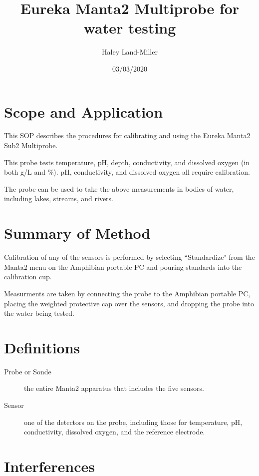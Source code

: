 \documentclass[12pt]{../SOP3}\usepackage[]{graphicx}\usepackage[]{color}
\title{Eureka Manta2 Multiprobe for water testing}
\date{03/03/2020}
\author{Haley Land-Miller}
\begin{document}
\maketitle

\section{Scope and Application}

\NP This SOP describes the procedures for calibrating and using the Eureka Manta2 Sub2 Multiprobe.

\NP This probe tests temperature, pH, depth, conductivity, and dissolved oxygen (in both g/L and \%). pH, conductivity, and dissolved oxygen all require calibration.

\NP The probe can be used to take the above measurements in bodies of water, including lakes, streams, and rivers. 

\section{Summary of Method}

\NP Calibration of any of the sensors is performed by selecting ``Standardize" from the Manta2 menu on the Amphibian portable PC and pouring standards into the calibration cup.

\NP Measurments are taken by connecting the probe to the Amphibian portable PC, placing the weighted protective cap over the sensors, and dropping the probe into the water being tested. 

\tableofcontents

\section{Definitions}

\begin{description}
\item[Probe or Sonde] the entire Manta2 apparatus that includes the five sensors.

\item[Sensor] one of the detectors on the probe, including those for temperature, pH, conductivity, dissolved oxygen, and the reference electrode.

\end{description}

\section{Interferences}
\end{document}
